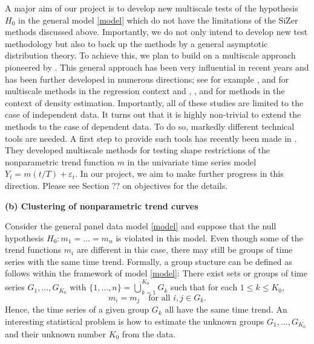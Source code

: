\documentclass[a4paper,12pt]{article}
\begin{document}
\begin{itemize}[label=--,leftmargin=0.5cm]
A major aim of our project is to develop new multiscale tests of the hypothesis $H_0$ in the general model \eqref{model} which do not have the limitations of the SiZer methods discussed above. Importantly, we do not only intend to develop new test methodology but also to back up the methods by a general asymptotic distribution theory. To achieve this, we plan to build on a multiscale approach pioneered by \cite{DuembgenSpokoiny2001}. This general approach has been very influential in recent years and has been further developed in numerous directions; see for example \cite{Duembgen2002}, \cite{Rohde2008} and \cite{ProkschWernerMunk2018} for multiscale methods in the regression context and \cite{DuembgenWalther2008}, \cite{RufibachWalther2010}, \cite{SchmidtHieber2013} and \cite{EckleBissantzDette2017} for methods in the context of density estimation. Importantly, all of these studies are limited to the case of independent data. It turns out that it is highly non-trivial to extend the methods to the case of dependent data. To do so, markedly different technical tools are needed. A first step to provide such tools has recently been made in \cite{KhismatullinaVogt2018}. They developed multiscale methods for testing shape restrictions of the nonparametric trend function $m$ in the univariate time series model $Y_t = m(t/T) + \varepsilon_t$. In our project, we aim to make further progress in this direction. Please see Section ?? on objectives for the details. 
\vspace{15pt}


\noindent \textbf{(b) Clustering of nonparametric trend curves} 
\vspace{10pt} 


\noindent Consider the general panel data model \eqref{model} and suppose that the null hypothesis $H_0: m_1 = \ldots = m_n$ is violated in this model. Even though some of the trend functions $m_i$ are different in this case, there may still be groups of time series with the same time trend. Formally, a group stucture can be defined as follows within the framework of model \eqref{model}: There exist sets or groups of time series $G_1,\ldots,G_{K_0}$ with $\{1,\ldots,n\} = \dot\bigcup_{k=1}^{K_0} G_k$ such that for each $1 \le k \le K_0$, 
\begin{equation}\label{model-groups}
m_i = m_j \quad \text{for all } i,j \in G_k. 
\end{equation}
Hence, the time series of a given group $G_k$ all have the same time trend. %
An interesting statistical problem is how to estimate the unknown groups $G_1,\ldots,G_{K_0}$ and their unknown number $K_0$ from the data. 



\end{itemize}
\end{document}
